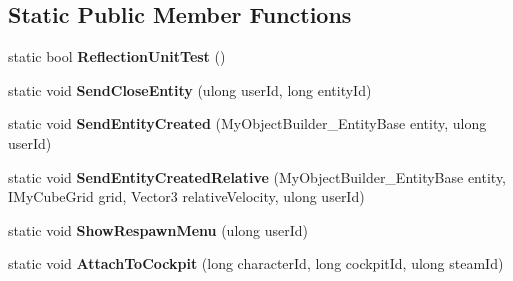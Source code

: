 \subsection*{Static Public Member Functions}
\begin{DoxyCompactItemize}
\item 
\hypertarget{class_s_e_mod_a_p_i_internal_1_1_a_p_i_1_1_server_1_1_server_network_manager_a7ede3ab159c45bfba9dce06c1853d225}{}static bool {\bfseries Reflection\+Unit\+Test} ()\label{class_s_e_mod_a_p_i_internal_1_1_a_p_i_1_1_server_1_1_server_network_manager_a7ede3ab159c45bfba9dce06c1853d225}

\item 
\hypertarget{class_s_e_mod_a_p_i_internal_1_1_a_p_i_1_1_server_1_1_server_network_manager_a1220a8f169296d50247e66651d36a039}{}static void {\bfseries Send\+Close\+Entity} (ulong user\+Id, long entity\+Id)\label{class_s_e_mod_a_p_i_internal_1_1_a_p_i_1_1_server_1_1_server_network_manager_a1220a8f169296d50247e66651d36a039}

\item 
\hypertarget{class_s_e_mod_a_p_i_internal_1_1_a_p_i_1_1_server_1_1_server_network_manager_a0e8371767ac5d822e0374a926d48f9c1}{}static void {\bfseries Send\+Entity\+Created} (My\+Object\+Builder\+\_\+\+Entity\+Base entity, ulong user\+Id)\label{class_s_e_mod_a_p_i_internal_1_1_a_p_i_1_1_server_1_1_server_network_manager_a0e8371767ac5d822e0374a926d48f9c1}

\item 
\hypertarget{class_s_e_mod_a_p_i_internal_1_1_a_p_i_1_1_server_1_1_server_network_manager_adeca0aaf5e1540996ba66044f5d675dc}{}static void {\bfseries Send\+Entity\+Created\+Relative} (My\+Object\+Builder\+\_\+\+Entity\+Base entity, I\+My\+Cube\+Grid grid, Vector3 relative\+Velocity, ulong user\+Id)\label{class_s_e_mod_a_p_i_internal_1_1_a_p_i_1_1_server_1_1_server_network_manager_adeca0aaf5e1540996ba66044f5d675dc}

\item 
\hypertarget{class_s_e_mod_a_p_i_internal_1_1_a_p_i_1_1_server_1_1_server_network_manager_a485c243b2b9f8f0ed2d432db096de154}{}static void {\bfseries Show\+Respawn\+Menu} (ulong user\+Id)\label{class_s_e_mod_a_p_i_internal_1_1_a_p_i_1_1_server_1_1_server_network_manager_a485c243b2b9f8f0ed2d432db096de154}

\item 
\hypertarget{class_s_e_mod_a_p_i_internal_1_1_a_p_i_1_1_server_1_1_server_network_manager_a6a7503906e1b137f1c1eec5973fb84e4}{}static void {\bfseries Attach\+To\+Cockpit} (long character\+Id, long cockpit\+Id, ulong steam\+Id)\label{class_s_e_mod_a_p_i_internal_1_1_a_p_i_1_1_server_1_1_server_network_manager_a6a7503906e1b137f1c1eec5973fb84e4}


\end{DoxyCompactItemize}
